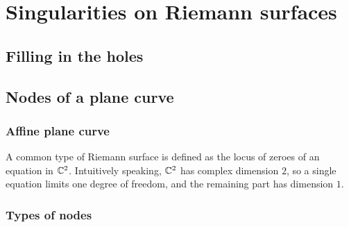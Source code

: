 \chapter{Singularities on Riemann surfaces}

\section{Filling in the holes}

\section{Nodes of a plane curve}

\subsection{Affine plane curve}
A common type of Riemann surface is defined as the locus of zeroes of an equation in $\mathbb C^2$.
Intuitively speaking, $\mathbb C^2$ has complex dimension $2$, so a single equation limits one degree of
freedom, and the remaining part has dimension $1$.

\subsection{Types of nodes}


